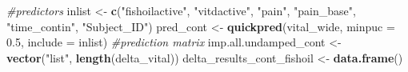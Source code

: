 \documentclass{article}
\newenvironment{Shaded}{\begin{snugshade}}{\end{snugshade}}
\newcommand{\AttributeTok}[1]{\textcolor[rgb]{0.13,0.29,0.53}{#1}}
\newcommand{\CommentTok}[1]{\textcolor[rgb]{0.56,0.35,0.01}{\textit{#1}}}
\newcommand{\FloatTok}[1]{\textcolor[rgb]{0.00,0.00,0.81}{#1}}
\newcommand{\FunctionTok}[1]{\textcolor[rgb]{0.13,0.29,0.53}{\textbf{#1}}}
\newcommand{\NormalTok}[1]{#1}
\newcommand{\OtherTok}[1]{\textcolor[rgb]{0.56,0.35,0.01}{#1}}
\newcommand{\StringTok}[1]{\textcolor[rgb]{0.31,0.60,0.02}{#1}}
\begin{document}
\begin{Shaded}
\begin{Highlighting}[]
\CommentTok{\#predictors}
\NormalTok{inlist }\OtherTok{\textless{}{-}} \FunctionTok{c}\NormalTok{(}\StringTok{"fishoilactive"}\NormalTok{, }\StringTok{"vitdactive"}\NormalTok{, }\StringTok{"pain"}\NormalTok{, }\StringTok{"pain\_base"}\NormalTok{, }\StringTok{"time\_contin"}\NormalTok{, }\StringTok{"Subject\_ID"}\NormalTok{) }
\NormalTok{pred\_cont }\OtherTok{\textless{}{-}} \FunctionTok{quickpred}\NormalTok{(vital\_wide, }\AttributeTok{minpuc =} \FloatTok{0.5}\NormalTok{, }\AttributeTok{include =}\NormalTok{ inlist) }\CommentTok{\#prediction matrix}
\NormalTok{imp.all.undamped\_cont }\OtherTok{\textless{}{-}} \FunctionTok{vector}\NormalTok{(}\StringTok{"list"}\NormalTok{, }\FunctionTok{length}\NormalTok{(delta\_vital))}
\NormalTok{delta\_results\_cont\_fishoil }\OtherTok{\textless{}{-}} \FunctionTok{data.frame}\NormalTok{()}


\end{Highlighting}
\end{Shaded}
\end{document}
